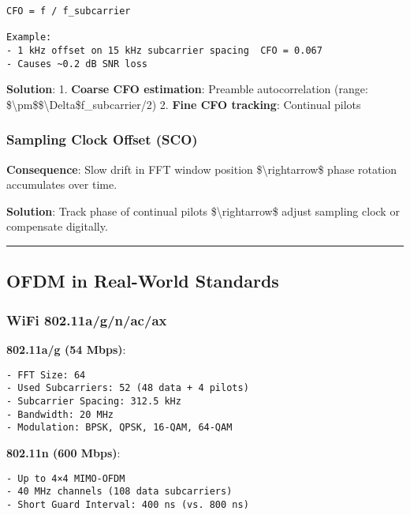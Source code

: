 \begin{verbatim}
CFO = f / f_subcarrier

Example:
- 1 kHz offset on 15 kHz subcarrier spacing  CFO = 0.067
- Causes ~0.2 dB SNR loss
\end{verbatim}

\textbf{Solution}: 1. \textbf{Coarse CFO estimation}: Preamble
autocorrelation (range:
\$\textbackslash pm\$\$\textbackslash Delta\$f\_subcarrier/2) 2.
\textbf{Fine CFO tracking}: Continual pilots

\subsubsection{Sampling Clock Offset
(SCO)}\label{sampling-clock-offset-sco}

\textbf{Consequence}: Slow drift in FFT window position
\$\textbackslash rightarrow\$ phase rotation accumulates over time.

\textbf{Solution}: Track phase of continual pilots
\$\textbackslash rightarrow\$ adjust sampling clock or compensate
digitally.

\begin{center}\rule{0.5\linewidth}{0.5pt}\end{center}

\subsection{\texorpdfstring{ OFDM in Real-World
Standards}{ OFDM in Real-World Standards}}\label{ofdm-in-real-world-standards}

\subsubsection{WiFi 802.11a/g/n/ac/ax}\label{wifi-802.11agnacax}

\textbf{802.11a/g (54 Mbps)}:

\begin{verbatim}
- FFT Size: 64
- Used Subcarriers: 52 (48 data + 4 pilots)
- Subcarrier Spacing: 312.5 kHz
- Bandwidth: 20 MHz
- Modulation: BPSK, QPSK, 16-QAM, 64-QAM
\end{verbatim}

\textbf{802.11n (600 Mbps)}:

\begin{verbatim}
- Up to 4×4 MIMO-OFDM
- 40 MHz channels (108 data subcarriers)
- Short Guard Interval: 400 ns (vs. 800 ns)
\end{verbatim}

